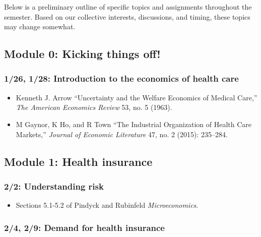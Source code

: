 \documentclass[11pt,]{article}
\providecommand{\tightlist}{%
  \setlength{\itemsep}{0pt}\setlength{\parskip}{0pt}}
\begin{document}
Below is a preliminary outline of specific topics and assignments
throughout the semester. Based on our collective interests, discussions,
and timing, these topics may change somewhat.

\hypertarget{module-0-kicking-things-off}{%
\subsection{Module 0: Kicking things
off!}\label{module-0-kicking-things-off}}

\hypertarget{introduction-to-the-economics-of-health-care}{%
\subsubsection{1/26, 1/28: Introduction to the economics of health
care}\label{introduction-to-the-economics-of-health-care}}

\begin{itemize}
\tightlist
\item
  Kenneth J. Arrow ``Uncertainty and the Welfare Economics of Medical
  Care,'' \emph{The American Economics Review} 53, no. 5 (1963).
\item
  M Gaynor, K Ho, and R Town ``The Industrial Organization of Health
  Care Markets,'' \emph{Journal of Economic Literature} 47, no. 2
  (2015): 235--284.
\end{itemize}

\hypertarget{module-1-health-insurance}{%
\subsection{Module 1: Health
insurance}\label{module-1-health-insurance}}

\hypertarget{understanding-risk}{%
\subsubsection{2/2: Understanding risk}\label{understanding-risk}}

\begin{itemize}
\tightlist
\item
  Sections 5.1-5.2 of Pindyck and Rubinfeld \emph{Microeconomics}.
\end{itemize}

\hypertarget{demand-for-health-insurance}{%
\subsubsection{2/4, 2/9: Demand for health
insurance}\label{demand-for-health-insurance}}
\end{document}
